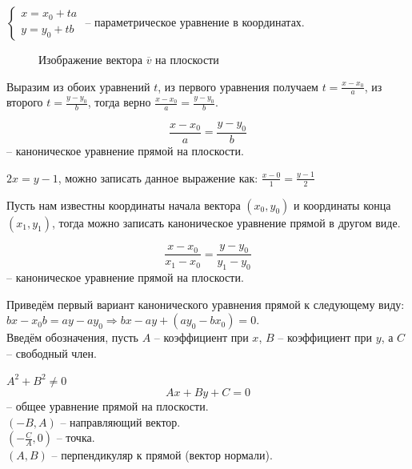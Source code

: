 	\begin{Def}
		$ \begin{cases}
			x = x_0 + ta\\
			y = y_0 + tb
		\end{cases} $ -- параметрическое уравнение в координатах.
	\end{Def}

	\begin{figure}[h]
		\centering
		\def\svgwidth{0.5\columnwidth}
		
		\caption{Изображение вектора $\overline{v}$ на плоскости}
	\end{figure}
	Выразим из обоих уравнений $t$, из первого уравнения получаем $t = \frac{x - x_0}{a}$, из второго $t = \frac{y - y_0}{b}$, тогда верно $\frac{x-x_0}{a} = \frac{y - y_0}{b}$.

	\begin{Def}
		$$\frac{x-x_0}{a} = \frac{y - y_0}{b}$$ -- каноническое уравнение прямой на плоскости.
	\end{Def}

	\begin{Example}
		$2x = y - 1$, можно записать данное выражение как: $\frac{x - 0}{1} = \frac{y - 1}{2}$
	\end{Example}

	Пусть нам известны координаты начала вектора $(x_0, y_0)$ и координаты конца $(x_1, y_1)$, тогда можно записать каноническое уравнение прямой в другом виде.

	\begin{figure}[h]
		\centering
		\def\svgwidth{0.2\columnwidth}
		
	\end{figure}

	\begin{Def}
		$$\frac{x-x_0}{x_1 - x_0} = \frac{y - y_0}{y_1 - y_0}$$ -- каноническое уравнение прямой на плоскости.
	\end{Def}

	Приведём первый вариант канонического уравнения прямой к следующему виду: \\
	$bx - x_0b = ay - ay_0 \Rightarrow bx - ay + (ay_0 -bx_0) = 0$.\\
	Введём обозначения, пусть $A$ -- коэффициент при $x$, $B$ -- коэффициент при $y$, а $C$ -- свободный член.

	\begin{Def}
		$A^2 + B^2 \neq 0$
		$$Ax + By + C = 0$$ -- общее уравнение прямой на плоскости. \\
		$(-B, A)$ -- направляющий вектор.\\
		$(-\frac{C}{A}, 0)$ -- точка.\\
		$(A, B)$ -- перпендикуляр к прямой (вектор нормали). 
	\end{Def}

